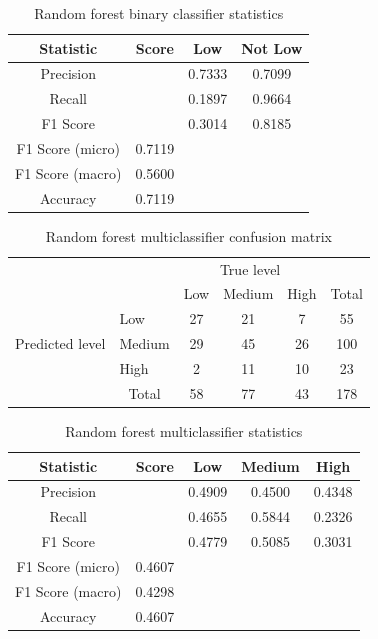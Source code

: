 \documentclass[12pt, a4paper]{article}
\begin{document}
\begin{table}[ht]
\centering
\begin{tabular}{||c c c c||} 
 \hline
 Statistic & Score & Low & Not Low  \\ [0.5ex] 
 \hline\hline
 Precision &  & 0.7333 & 0.7099 \\ 
 Recall & & 0.1897 & 0.9664 \\
 F1 Score &  & 0.3014 & 0.8185 \\
 F1 Score (micro) & 0.7119 & & \\
 F1 Score (macro)  & 0.5600 & &  \\ 
 Accuracy  & 0.7119 & & \\ [1ex] 
 \hline
\end{tabular}
\caption{Random forest binary classifier statistics}
\label{table:rfstat_low}
\end{table}

\begin{table}[ht]
\centering
\begin{tabular}{l|l|c|c|c|c}
\multicolumn{2}{c}{}&\multicolumn{3}{c}{True level}&\\
\cline{3-5}
\multicolumn{2}{c|}{}&Low&Medium&High&\multicolumn{1}{c}{Total}\\
\cline{2-5}
\multirow{3}{*}{Predicted level}& Low & 27 & 21 & 7 & 55\\
\cline{2-5}
& Medium & 29 & 45 & 26 & 100\\
\cline{2-5}
& High & 2 & 11 & 10 & 23\\
\cline{2-5}
\multicolumn{1}{c}{} & \multicolumn{1}{c}{Total} & \multicolumn{1}{c}{58} & \multicolumn{    1}{c}{77} & \multicolumn{    1}{c}{43} & \multicolumn{1}{c}{178}\\
\end{tabular}

\caption{Random forest multiclassifier confusion matrix}
\label{table:rfcm}
\end{table}

\begin{table}[ht]
\centering
\begin{tabular}{||c c c c c||} 
 \hline
 Statistic & Score & Low & Medium & High  \\ [0.5ex] 
 \hline\hline
 Precision &  & 0.4909 & 0.4500 & 0.4348 \\ 
 Recall & & 0.4655 & 0.5844  & 0.2326 \\
 F1 Score &  & 0.4779 & 0.5085  & 0.3031\\
 F1 Score (micro) & 0.4607 & & & \\
 F1 Score (macro)  & 0.4298 & & & \\ 
 Accuracy  & 0.4607 & & & \\ [1ex] 
 \hline
\end{tabular}

\caption{Random forest multiclassifier statistics}
\label{table:rfstat}
\end{table}
\end{document}
